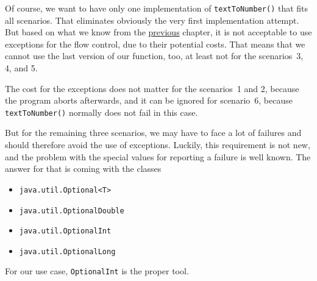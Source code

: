 Of course, we want to have only one implementation of \lstinline|textToNumber()| that fits all scenarios. That eliminates obviously the very first implementation attempt. But based on what we know from the \hyperref[sec:ExceptionCosts]{previous} chapter, it is not acceptable to use exceptions for the flow control, due to their potential costs. That means that we cannot use the last version of our function, too, at least not for the scenarios~3, 4, and 5.

The cost for the exceptions does not matter for the scenarios~1 and 2, because the program aborts afterwards, and it can be ignored for scenario~6, because \lstinline|textToNumber()| normally does not fail in this case.

But for the remaining three scenarios, we may have to face a lot of failures and should therefore avoid the use of exceptions. Luckily, this requirement is not new, and the problem with the special values for reporting a failure is well known. The answer for that is coming with the classes
\begin{itemize}[nosep]
	\item{\lstinline|java.util.Optional<T>| \autocite{ORACLE_DOC_OPTIONAL_CLASS}}
	\item{\lstinline|java.util.OptionalDouble| \autocite{ORACLE_DOC_OPTIONALDOUBLE_CLASS}}
	\item{\lstinline|java.util.OptionalInt| \autocite{ORACLE_DOC_OPTIONALINT_CLASS}}
	\item{\lstinline|java.util.OptionalLong| \autocite{ORACLE_DOC_OPTIONALLONG_CLASS}}
\end{itemize}

For our use case, \lstinline|OptionalInt| is the proper tool.

